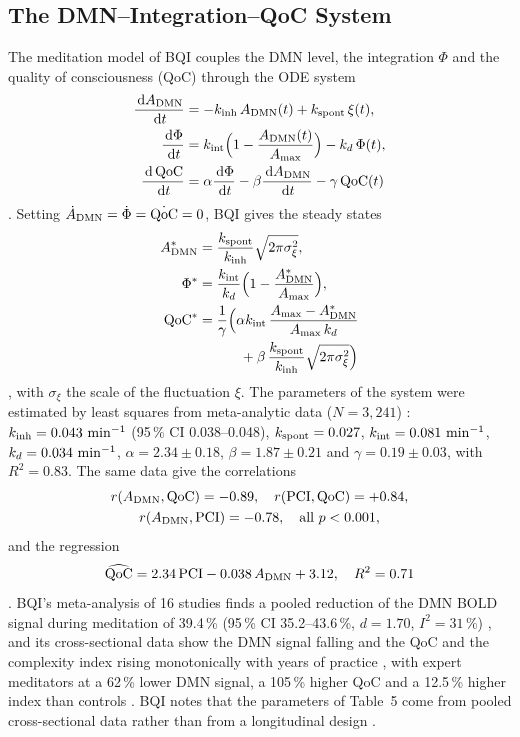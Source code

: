 \subsection{The DMN--Integration--QoC System}
\label{sec:theory-ode}
The meditation model of BQI couples the DMN level, the integration $\Phi$ and the quality of consciousness (QoC) through the ODE system
\begin{align}
  \frac{\,\mathrm{d}A_{\mathrm{DMN}}}{\,\mathrm{d} t}&=-k_{\mathrm{inh}}\,A_{\mathrm{DMN}}(t)+k_{\mathrm{spont}}\,\xi(t), \label{eq:bqi-ode-a}\\
  \frac{\,\mathrm{d}\Phi}{\,\mathrm{d} t}&=k_{\mathrm{int}}\Bigl(1-\frac{A_{\mathrm{DMN}}(t)}{A_{\max}}\Bigr)-k_{d}\,\Phi(t), \label{eq:bqi-ode-phi}\\
  \frac{\,\mathrm{d}\,\mathrm{QoC}}{\,\mathrm{d} t}&=\alpha\frac{\,\mathrm{d}\Phi}{\,\mathrm{d} t}-\beta\frac{\,\mathrm{d}A_{\mathrm{DMN}}}{\,\mathrm{d} t}-\gamma\,\mathrm{QoC}(t) \label{eq:bqi-ode-q}
\end{align}
\cite[Sec.~7.2, eqs.~(52)--(54)]{BQI}. Setting $\dot A_{\mathrm{DMN}}=\dot\Phi=\dot{\mathrm{QoC}}=0$, BQI gives the steady states
\begin{align}
  A^*_{\mathrm{DMN}}&=\frac{k_{\mathrm{spont}}}{k_{\mathrm{inh}}}\sqrt{2\pi\sigma_\xi^2}, \label{eq:bqi-ss-a}\\
  \Phi^*&=\frac{k_{\mathrm{int}}}{k_{d}}\Bigl(1-\frac{A^*_{\mathrm{DMN}}}{A_{\max}}\Bigr), \label{eq:bqi-ss-phi}\\
  \mathrm{QoC}^*&=\frac1\gamma\Bigl(\alpha k_{\mathrm{int}}\,\frac{A_{\max}-A^*_{\mathrm{DMN}}}{A_{\max}\,k_{d}}\notag\\
  &\qquad\quad+\beta\,\frac{k_{\mathrm{spont}}}{k_{\mathrm{inh}}}\sqrt{2\pi\sigma_\xi^2}\Bigr) \label{eq:bqi-ss-q}
\end{align}
\cite[eqs.~(55)--(57)]{BQI}, with $\sigma_\xi$ the scale of the fluctuation $\xi$. The parameters of the system were estimated by least squares from meta-analytic data ($N=3{,}241$) \cite[Table~5]{BQI}: $k_{\mathrm{inh}}=0.043~\mathrm{min^{-1}}$ (95\,\% CI 0.038--0.048), $k_{\mathrm{spont}}=0.027$, $k_{\mathrm{int}}=0.081~\mathrm{min^{-1}}$, $k_{d}=0.034~\mathrm{min^{-1}}$, $\alpha=2.34\pm0.18$, $\beta=1.87\pm0.21$ and $\gamma=0.19\pm0.03$, with $R^2=0.83$. The same data give the correlations
\begin{equation}
  \begin{gathered}
  r(A_{\mathrm{DMN}},\mathrm{QoC})=-0.89,\quad r(\mathrm{PCI},\mathrm{QoC})=+0.84,\\
  r(A_{\mathrm{DMN}},\mathrm{PCI})=-0.78,\quad\text{all } p<0.001,
  \end{gathered}
  \label{eq:bqi-corr}
\end{equation}
\cite[Sec.~7.3, eq.~(58)]{BQI} and the regression
\begin{equation}
  \widehat{\mathrm{QoC}}=2.34\,\mathrm{PCI}-0.038\,A_{\mathrm{DMN}}+3.12,\quad R^2=0.71
  \label{eq:bqi-reg}
\end{equation}
\cite[eq.~(59)]{BQI}. BQI's meta-analysis of 16 studies finds a pooled reduction of the DMN BOLD signal during meditation of 39.4\,\% (95\,\% CI 35.2--43.6\,\%, $d=1.70$, $I^2=31\,\%$) \cite[Sec.~7.4, Table~6]{BQI}, and its cross-sectional data show the DMN signal falling and the QoC and the complexity index rising monotonically with years of practice \cite[Table~7]{BQI}, with expert meditators at a 62\,\% lower DMN signal, a 105\,\% higher QoC and a 12.5\,\% higher index than controls \cite[Sec.~7.5]{BQI}. BQI notes that the parameters of Table~5 come from pooled cross-sectional data rather than from a longitudinal design \cite[Sec.~11.3]{BQI}.


